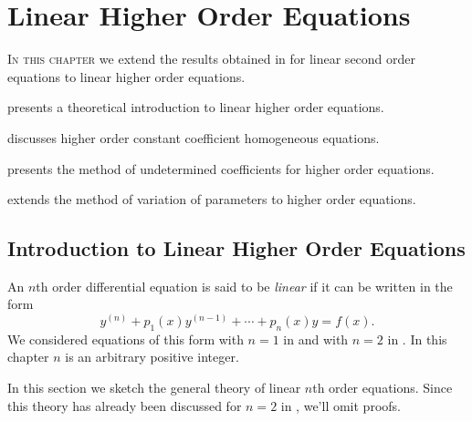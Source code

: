 
\chapter{Linear Higher Order Equations}\label{ch:higher_order}

\noindent
\textsc{In this chapter}
 we  extend  the results obtained
in  for linear second order  equations
to linear higher order equations.

\medskip\noindent
{} presents a theoretical introduction to
linear higher order equations.


\medskip\noindent
{} discusses higher order constant
coefficient
homogeneous equations.


\medskip\noindent
{} presents the method of
undetermined coefficients for
higher order equations.


\medskip\noindent
{} extends the
method of  variation of parameters to  higher order
equations.

\newpage

\section{Introduction to Linear Higher Order Equations}
\label{sec:higher_theory}

An $n$th order differential equation is said to be \emph{\color{blue}linear} if it
can be written in the form
\begin{equation}\label{eq:9.1.1}
y^{(n)}+p_1(x)y^{(n-1)}+\cdots+p_n(x)y=f(x).
\end{equation}
We considered equations of this form with $n=1$ in
 and with $n=2$ in
. In this chapter $n$ is an arbitrary
positive integer.

In this section we sketch the general theory of linear $n$th order
equations. Since this theory has already been discussed for $n=2$ in
, we'll omit
proofs.

